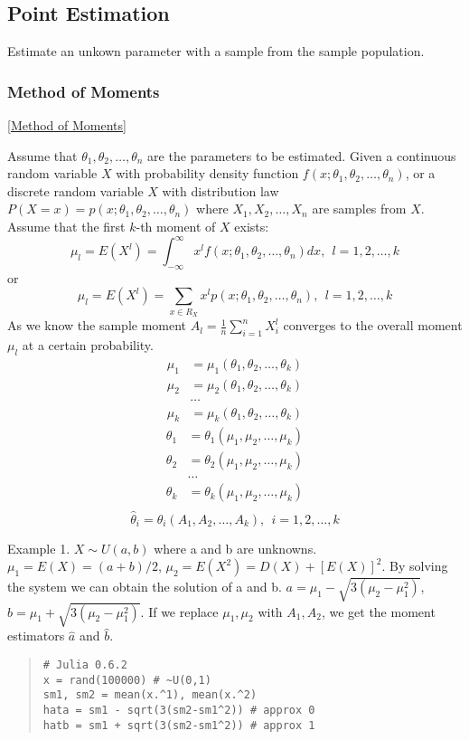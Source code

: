 \subsection{Point Estimation}

Estimate an unkown parameter with a sample from the sample population.

\subsubsection{Method of Moments}

[\href{https://en.wikipedia.org/wiki/Method_of_moments_(statistics)}{Method of Moments}]

Assume that $\theta_1,\theta_2,\ldots,\theta_n$ are the parameters to be
estimated. Given a continuous random variable $X$ with probability
density function $f(x;\theta_1,\theta_2,\ldots,\theta_n)$, or a discrete
random variable $X$ with distribution law
$P(X=x)=p(x;\theta_1,\theta_2,\ldots,\theta_n)$
where $X_1,X_2,\ldots,X_n$ are samples from $X$. Assume that the first
$k$-th moment of $X$ exists:
$$ \mu_l = E(X^l) = \int_{-\infty}^\infty
   x^l f(x;\theta_1,\theta_2,\ldots,\theta_n) dx, ~~l=1,2,\ldots,k $$
or
$$ \mu_l = E(X^l) = \sum_{x\in R_X}
   x^l p(x;\theta_1,\theta_2,\ldots,\theta_n), ~~l=1,2,\ldots,k $$
As we know the sample moment $A_l = \frac{1}{n} \sum_{i=1}^n X_i^l$
converges to the overall moment $\mu_l$ at a certain probability.
\begin{align}
	\mu_1 &= \mu_1(\theta_1,\theta_2,\ldots,\theta_k)\\
	\mu_2 &= \mu_2(\theta_1,\theta_2,\ldots,\theta_k)\\
	& \ldots\\
	\mu_k &= \mu_k(\theta_1,\theta_2,\ldots,\theta_k)
\end{align}
\begin{align}
	\theta_1 &= \theta_1(\mu_1,\mu_2,\ldots,\mu_k)\\
	\theta_2 &= \theta_2(\mu_1,\mu_2,\ldots,\mu_k)\\
	& \ldots\\
	\theta_k &= \theta_k(\mu_1,\mu_2,\ldots,\mu_k)\\
\end{align}
$$ \hat{\theta}_i = \theta_i(A_1, A_2, \ldots, A_k),~~i=1,2,\ldots,k $$

Example 1. $X\sim U(a,b)$ where a and b are unknowns.
$\mu_1 = E(X) = (a+b)/2$, $\mu_2 = E(X^2) = D(X) + [E(X)]^2$.
By solving the system we can obtain the solution of a and b.
$a = \mu_1 - \sqrt{3(\mu_2-\mu_1^2)}$,
$b = \mu_1 + \sqrt{3(\mu_2-\mu_1^2)}$.
If we replace $\mu_1,\mu_2$ with $A_1,A_2$, we get the moment estimators
$\hat{a}$ and $\hat{b}$.
\begin{quote}
	\begin{verbatim}
# Julia 0.6.2
x = rand(100000) # ~U(0,1)
sm1, sm2 = mean(x.^1), mean(x.^2)
hata = sm1 - sqrt(3(sm2-sm1^2)) # approx 0
hatb = sm1 + sqrt(3(sm2-sm1^2)) # approx 1
	\end{verbatim}
\end{quote}

